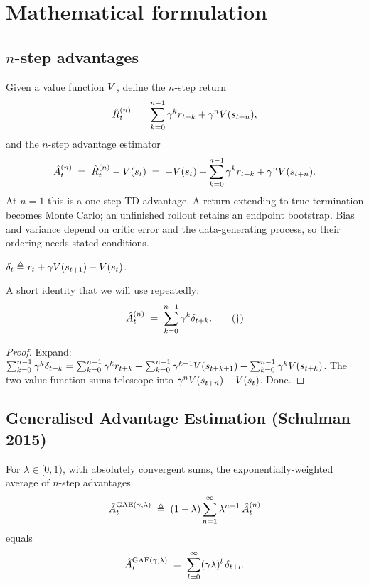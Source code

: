 \documentclass[11pt,oneside]{scrbook}
\begin{document}
\chapter{Mathematical formulation}

\section{$n$-step advantages}

Given a value function $V$, define the $n$-step return
\[
  \hat R_t^{(n)} \;=\; \sum_{k=0}^{n-1} \gamma^k r_{t+k} + \gamma^n V(s_{t+n}),
\]
and the $n$-step advantage estimator
\[
  \hat {A}_t^{(n)} \;=\; \hat R_t^{(n)} - V(s_t) \;=\; -V(s_t) + \sum_{k=0}^{n-1} \gamma^k r_{t+k} + \gamma^n V(s_{t+n}).
\]
At $n=1$ this is a one-step TD advantage. A return extending to true termination becomes Monte Carlo; an unfinished rollout retains an endpoint bootstrap. Bias and variance depend on critic error and the data-generating process, so their ordering needs stated conditions.

\begin{definition}
\label{def:td}
$\delta_t \triangleq r_t + \gamma V(s_{t+1}) - V(s_t)$.
\end{definition}

A short identity that we will use repeatedly:
\[
  \hat {A}_t^{(n)} \;=\; \sum_{k=0}^{n-1} \gamma^k \delta_{t+k}. \tag{$\dag$}
\]
\begin{proof}
Expand: $\sum_{k=0}^{n-1} \gamma^k \delta_{t+k} = \sum_{k=0}^{n-1} \gamma^k r_{t+k} + \sum_{k=0}^{n-1} \gamma^{k+1} V(s_{t+k+1}) - \sum_{k=0}^{n-1} \gamma^k V(s_{t+k})$. The two value-function sums telescope into $\gamma^n V(s_{t+n}) - V(s_t)$. Done.
\end{proof}

\section{Generalised Advantage Estimation (Schulman 2015)}

\begin{theorem}
\label{thm:gae}
For $\lambda \in [0,1)$, with absolutely convergent sums, the exponentially-weighted average of $n$-step advantages
\[
  \hat {A}_t^{\mathrm{GAE}(\gamma,\lambda)} \;\triangleq\; (1-\lambda)\sum_{n=1}^{\infty} \lambda^{n-1}\, \hat {A}_t^{(n)}
\]
equals
\[
  \hat {A}_t^{\mathrm{GAE}(\gamma,\lambda)} \;=\; \sum_{l=0}^{\infty} (\gamma\lambda)^l\, \delta_{t+l}.
\]
\end{theorem}
\end{document}
